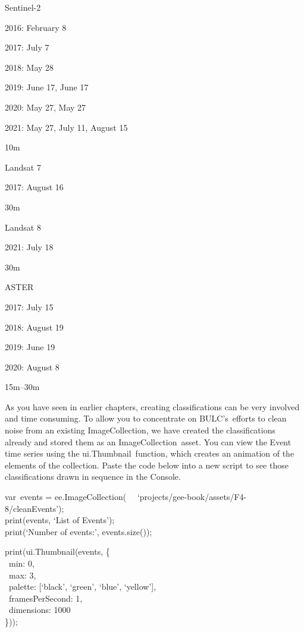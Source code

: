 \documentclass[
  letterpaper,
  DIV=11,
  numbers=noendperiod]{scrreprt}
\begin{document}
Sentinel-2

2016: February 8

2017: July 7

2018: May 28

2019: June 17, June 17

2020: May 27, May 27

2021: May 27, July 11, August 15

10m

Landsat 7

2017: August 16

30m

Landsat 8

2021: July 18

30m

ASTER

2017: July 15

2018: August 19

2019: June 19

2020: August 8

15m--30m

As you have seen in earlier chapters, creating classifications can be
very involved and time consuming. To allow you to concentrate on
BULC's~efforts to clean noise from an existing ImageCollection, we have
created the classifications already and stored them as an
ImageCollection~asset. You can view the Event time series using the
ui.Thumbnail~function, which creates an animation of the elements of the
collection\hspace{0pt}\hspace{0pt}\hspace{0pt}\hspace{0pt}. Paste the
code below into a new script to see those classifications drawn in
sequence in the Console.

var~events = ee.ImageCollection(~
~`projects/gee-book/assets/F4-8/cleanEvents');\\
print(events, `List of Events');\\
print(`Number of events:', events.size());

print(ui.Thumbnail(events, \{\\
\hspace*{0.333em} ~min: 0,\\
\hspace*{0.333em} ~max: 3,\\
\hspace*{0.333em} ~palette: {[}`black', `green', `blue', `yellow'{]},\\
\hspace*{0.333em} ~framesPerSecond: 1,\\
\hspace*{0.333em} ~dimensions: 1000\\
\}));
\end{document}
